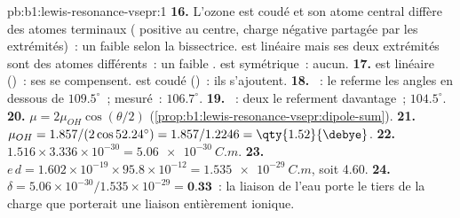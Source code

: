 \begin{solution}{pb:b1:lewis-resonance-vsepr:1}
\textbf{16.} L'ozone est coudé et son atome central diffère des atomes
terminaux ( positive au centre, charge négative partagée
par les extrémités)~: un faible  selon la bissectrice.
 est linéaire mais ses deux extrémités sont des atomes
différents~: un faible .  est symétrique~: aucun.
\textbf{17.}  est linéaire ()~: ses  se
compensent.  est coudé ()~: ils s'ajoutent.
\textbf{18.} ~: le  referme les angles
en dessous de $109.5^\circ$~; mesuré~: $106.7^\circ$.
\textbf{19.} ~: deux  le referment davantage~;
$104.5^\circ$.
\textbf{20.} $\mu = 2\mu_{OH}\cos(\theta/2)$
(\cref{prop:b1:lewis-resonance-vsepr:dipole-sum}).
\textbf{21.} $\mu_{OH} = 1.857/(2\cos 52.24^\circ) = 1.857/1.2246 =
\qty{1.52}{\debye}$.
\textbf{22.} $1.516 \times 3.336 \times 10^{-30} = \qty{5.06e-30}{C.m}$.
\textbf{23.} $e\,d = 1.602 \times 10^{-19} \times 95.8 \times 10^{-12} =
\qty{1.535e-29}{C.m}$, soit \qty{4.60}{\debye}.
\textbf{24.} $\delta = 5.06 \times 10^{-30}/1.535 \times 10^{-29} =
\textbf{0.33}$~: la liaison  de l'eau porte le tiers de la
charge que porterait une liaison entièrement ionique.
\end{solution}
